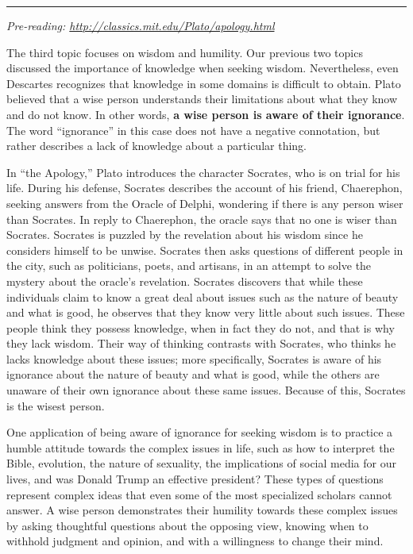 \documentclass[
]{book}
\begin{document}
\begin{center}\rule{0.5\linewidth}{0.5pt}\end{center}

\emph{Pre-reading: \url{http://classics.mit.edu/Plato/apology.html}}

The third topic focuses on wisdom and humility. Our previous two topics discussed the importance of knowledge when seeking wisdom. Nevertheless, even Descartes recognizes that knowledge in some domains is difficult to obtain. Plato believed that a wise person understands their limitations about what they know and do not know. In other words, \textbf{a wise person is aware of their ignorance}. The word ``ignorance'' in this case does not have a negative connotation, but rather describes a lack of knowledge about a particular thing.

In ``the Apology,'' Plato introduces the character Socrates, who is on trial for his life. During his defense, Socrates describes the account of his friend, Chaerephon, seeking answers from the Oracle of Delphi, wondering if there is any person wiser than Socrates. In reply to Chaerephon, the oracle says that no one is wiser than Socrates. Socrates is puzzled by the revelation about his wisdom since he considers himself to be unwise. Socrates then asks questions of different people in the city, such as politicians, poets, and artisans, in an attempt to solve the mystery about the oracle's revelation. Socrates discovers that while these individuals claim to know a great deal about issues such as the nature of beauty and what is good, he observes that they know very little about such issues. These people think they possess knowledge, when in fact they do not, and that is why they lack wisdom. Their way of thinking contrasts with Socrates, who thinks he lacks knowledge about these issues; more specifically, Socrates is aware of his ignorance about the nature of beauty and what is good, while the others are unaware of their own ignorance about these same issues. Because of this, Socrates is the wisest person.

One application of being aware of ignorance for seeking wisdom is to practice a humble attitude towards the complex issues in life, such as how to interpret the Bible, evolution, the nature of sexuality, the implications of social media for our lives, and was Donald Trump an effective president? These types of questions represent complex ideas that even some of the most specialized scholars cannot answer. A wise person demonstrates their humility towards these complex issues by asking thoughtful questions about the opposing view, knowing when to withhold judgment and opinion, and with a willingness to change their mind.
\end{document}
